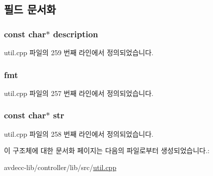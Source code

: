 \subsection{필드 문서화}
\subsubsection[{\texorpdfstring{description}{description}}]{\setlength{\rightskip}{0pt plus 5cm}const char$\ast$ description}\hypertarget{structavdecc__lib_1_1utility_1_1ieee1722__format_a68344fa88cf4e86b5079fd69a5c22d57}{}\label{structavdecc__lib_1_1utility_1_1ieee1722__format_a68344fa88cf4e86b5079fd69a5c22d57}


util.\+cpp 파일의 259 번째 라인에서 정의되었습니다.

\subsubsection[{\texorpdfstring{fmt}{fmt}}]{ fmt}\hypertarget{structavdecc__lib_1_1utility_1_1ieee1722__format_affa944a371d714ce1474de9a9ef7b6f8}{}\label{structavdecc__lib_1_1utility_1_1ieee1722__format_affa944a371d714ce1474de9a9ef7b6f8}


util.\+cpp 파일의 257 번째 라인에서 정의되었습니다.

\subsubsection[{\texorpdfstring{str}{str}}]{\setlength{\rightskip}{0pt plus 5cm}const char$\ast$ str}\hypertarget{structavdecc__lib_1_1utility_1_1ieee1722__format_af25d6dc49269fa2003ac7c7fa6f13915}{}\label{structavdecc__lib_1_1utility_1_1ieee1722__format_af25d6dc49269fa2003ac7c7fa6f13915}


util.\+cpp 파일의 258 번째 라인에서 정의되었습니다.



이 구조체에 대한 문서화 페이지는 다음의 파일로부터 생성되었습니다.\+:\begin{DoxyCompactItemize}
\item 
avdecc-\/lib/controller/lib/src/\hyperlink{util_8cpp}{util.\+cpp}\end{DoxyCompactItemize}
